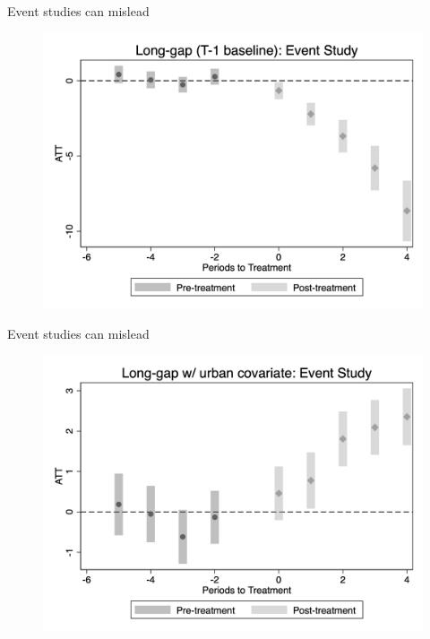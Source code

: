 \documentclass{beamer}
\begin{document}
\begin{frame}{Event studies can mislead}

\begin{figure}
    \centering
    \includegraphics[height=0.75\textheight]{./lecture_includes/es_flawed.png}
\end{figure}

\end{frame}


\begin{frame}{Event studies can mislead}

\begin{figure}
    \centering
    \includegraphics[height=0.75\textheight]{./lecture_includes/es_correct.png}
\end{figure}

\end{frame}
\end{document}
